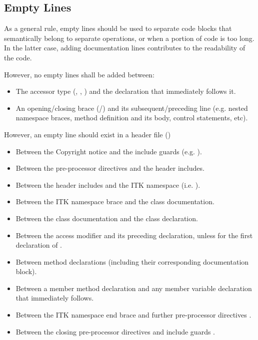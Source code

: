 \subsection{Empty Lines}%
\label{subsec:EmptyLines}

As a general rule, empty lines should be used to separate code blocks that
semantically belong to separate operations, or when a portion of code is
too long. In the latter case, adding documentation lines contributes to the
readability of the code.

However, no empty lines shall be added between:
\begin{itemize}
\item The accessor type (, , ) and
the declaration that immediately follows it.
\item An opening/closing brace (\code{\{}/\code{\}}) and its
subsequent/preceding line (e.g. nested namespace braces, method definition and
its body, control statements, etc).
\end{itemize}

However, an empty line should exist in a header file ()
\begin{itemize}
\item Between the Copyright notice and the include guards (e.g.
).
\item Between the pre-processor directives and the header includes.
\item Between the header includes and the ITK namespace (i.e.
).
\item Between the ITK namespace brace and the class documentation.
\item Between the class documentation and the class declaration.
\item Between the access modifier and its preceding declaration, unless for the
first declaration of .
\item Between method declarations (including their corresponding documentation
block).
\item Between a member method declaration and any member variable declaration
that immediately follows.
\item Between the ITK namespace end brace  and
further pre-processor directives .
\item Between the closing pre-processor directives and include guards .
\end{itemize}

